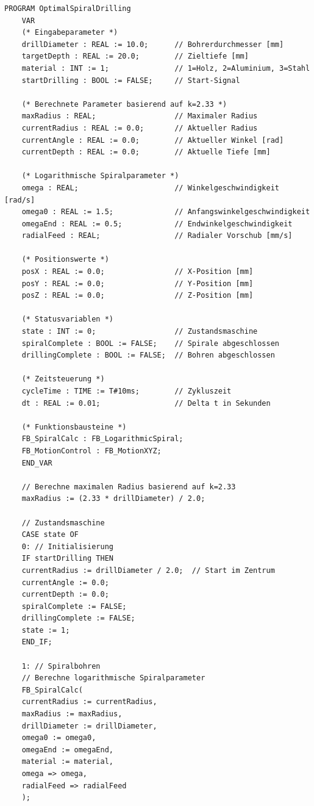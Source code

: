 ﻿\documentclass[12pt,a4paper]{article}
\begin{document}
\begin{lstlisting}[style=structuredtext, caption={Hauptprogramm fÃ¼r optimales Spiralbohren}, label={lst:main}]
	PROGRAM OptimalSpiralDrilling
	VAR
	(* Eingabeparameter *)
	drillDiameter : REAL := 10.0;      // Bohrerdurchmesser [mm]
	targetDepth : REAL := 20.0;        // Zieltiefe [mm]
	material : INT := 1;               // 1=Holz, 2=Aluminium, 3=Stahl
	startDrilling : BOOL := FALSE;     // Start-Signal
	
	(* Berechnete Parameter basierend auf k=2.33 *)
	maxRadius : REAL;                  // Maximaler Radius
	currentRadius : REAL := 0.0;       // Aktueller Radius
	currentAngle : REAL := 0.0;        // Aktueller Winkel [rad]
	currentDepth : REAL := 0.0;        // Aktuelle Tiefe [mm]
	
	(* Logarithmische Spiralparameter *)
	omega : REAL;                      // Winkelgeschwindigkeit [rad/s]
	omega0 : REAL := 1.5;              // Anfangswinkelgeschwindigkeit
	omegaEnd : REAL := 0.5;            // Endwinkelgeschwindigkeit
	radialFeed : REAL;                 // Radialer Vorschub [mm/s]
	
	(* Positionswerte *)
	posX : REAL := 0.0;                // X-Position [mm]
	posY : REAL := 0.0;                // Y-Position [mm]
	posZ : REAL := 0.0;                // Z-Position [mm]
	
	(* Statusvariablen *)
	state : INT := 0;                  // Zustandsmaschine
	spiralComplete : BOOL := FALSE;    // Spirale abgeschlossen
	drillingComplete : BOOL := FALSE;  // Bohren abgeschlossen
	
	(* Zeitsteuerung *)
	cycleTime : TIME := T#10ms;        // Zykluszeit
	dt : REAL := 0.01;                 // Delta t in Sekunden
	
	(* Funktionsbausteine *)
	FB_SpiralCalc : FB_LogarithmicSpiral;
	FB_MotionControl : FB_MotionXYZ;
	END_VAR
	
	// Berechne maximalen Radius basierend auf k=2.33
	maxRadius := (2.33 * drillDiameter) / 2.0;
	
	// Zustandsmaschine
	CASE state OF
	0: // Initialisierung
	IF startDrilling THEN
	currentRadius := drillDiameter / 2.0;  // Start im Zentrum
	currentAngle := 0.0;
	currentDepth := 0.0;
	spiralComplete := FALSE;
	drillingComplete := FALSE;
	state := 1;
	END_IF;
	
	1: // Spiralbohren
	// Berechne logarithmische Spiralparameter
	FB_SpiralCalc(
	currentRadius := currentRadius,
	maxRadius := maxRadius,
	drillDiameter := drillDiameter,
	omega0 := omega0,
	omegaEnd := omegaEnd,
	material := material,
	omega => omega,
	radialFeed => radialFeed
	);
	

\end{lstlisting}
\end{document}
